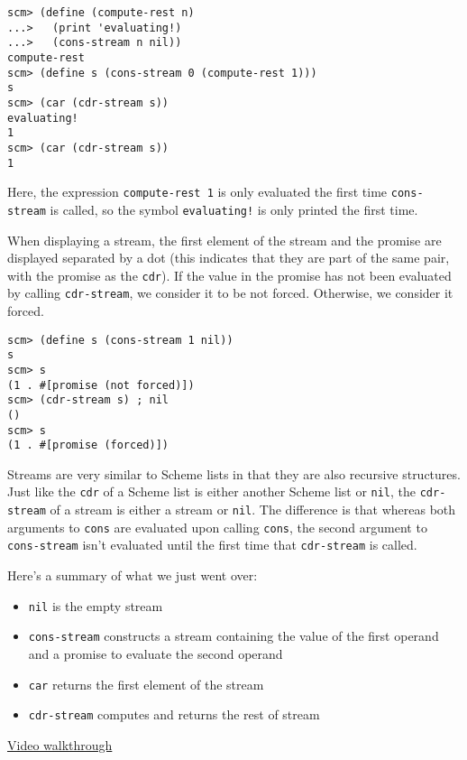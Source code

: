 \begin{lstlisting}
scm> (define (compute-rest n)
...>   (print 'evaluating!)
...>   (cons-stream n nil))
compute-rest
scm> (define s (cons-stream 0 (compute-rest 1)))
s
scm> (car (cdr-stream s))
evaluating!
1
scm> (car (cdr-stream s))
1
\end{lstlisting}

Here, the expression \texttt{compute-rest 1} is only evaluated the first time
\texttt{cons-stream} is called, so the symbol \texttt{evaluating!} is only
printed the first time.

When displaying a stream, the first element of the stream and the promise are 
displayed separated by a dot (this indicates that they are part of the same pair, with
the promise as the \texttt{cdr}).
If the value in the promise has not been evaluated by calling \texttt{cdr-stream}, 
we consider it to be not forced. Otherwise, we consider it forced.

\begin{lstlisting}
scm> (define s (cons-stream 1 nil))
s
scm> s
(1 . #[promise (not forced)])
scm> (cdr-stream s) ; nil
()
scm> s
(1 . #[promise (forced)])
\end{lstlisting}


Streams are very similar to Scheme lists in that they are also recursive
structures. Just like the \texttt{cdr} of a Scheme list is either another
Scheme list or \texttt{nil}, the \texttt{cdr-stream} of a stream is either a
stream or \texttt{nil}. The difference is that whereas both arguments to
\texttt{cons} are evaluated upon calling \texttt{cons}, the second argument
to \texttt{cons-stream} isn't evaluated until the first time that
\texttt{cdr-stream} is called.

Here's a summary of what we just went over:

\begin{itemize}
    \item \texttt{nil} is the empty stream
    \item \texttt{cons-stream} constructs a stream containing the value of the
        first operand and a promise to evaluate the second operand
    \item \texttt{car} returns the first element of the stream
    \item \texttt{cdr-stream} computes and returns the rest of stream
\end{itemize}

\begin{solution}[0.1in]
\href{https://youtu.be/N-AGcLiPDao}{Video walkthrough}
\end{solution}
